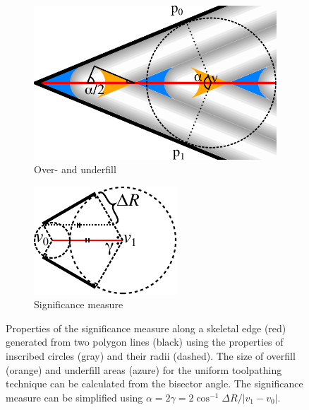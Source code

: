 \begin{figure}
\centering
\setlength{\figheight}{.3\columnwidth}
\begin{subfigure}{0.45\columnwidth} \centering
\includegraphics[height=\figheight,frame]{sources-method-naive-overfill-underfill.pdf}
\caption{Over- and underfill}\label{naive_overfill_underfill}
\end{subfigure}
\begin{subfigure}{0.45\columnwidth} \centering
\includegraphics[height=.8\figheight]{sources-method-significance-properties.pdf}
\caption{Significance measure}\label{distance_based_angles}
\end{subfigure}
\caption{
Properties of the significance measure along a skeletal edge (red) generated from two polygon lines (black) using the properties of inscribed circles (gray) and their radii (dashed).
The size of overfill (orange) and underfill areas (azure) for the uniform toolpathing technique can be calculated from the bisector angle.
The significance measure can be simplified using $\alpha = 2 \gamma = 2 \cos^{-1} \Delta R / |v_1 - v_0|$.
}
\end{figure}

